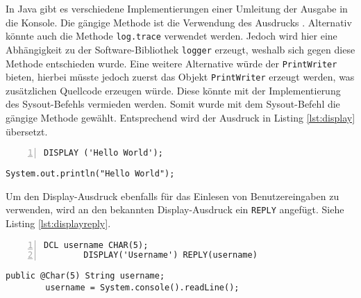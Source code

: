 In Java gibt es verschiedene Implementierungen einer Umleitung der Ausgabe in die Konsole.
Die gängige Methode ist die Verwendung des Ausdrucks . 
Alternativ könnte auch die Methode \verb+log.trace+ verwendet werden.
Jedoch wird hier eine Abhängigkeit zu der Software-Bibliothek \verb+logger+  erzeugt, weshalb sich gegen diese Methode entschieden wurde.
Eine weitere Alternative würde der \verb+PrintWriter+ bieten, hierbei müsste jedoch zuerst das Objekt \verb+PrintWriter+ erzeugt werden, was zusätzlichen Quellcode erzeugen würde. Diese könnte mit der Implementierung des Sysout-Befehls vermieden werden.
Somit wurde mit dem Sysout-Befehl die gängige Methode gewählt. Entsprechend wird der Ausdruck in Listing \ref{lst:display} übersetzt.

\begin{minipage}[b]{0.48\linewidth}
	\centering
	\lstset{language=PL/I,label=SliceExaple}
	\begin{lstlisting}[frame=single, numbers=left, mathescape,%
		caption={Transformation Standardausgabe}, label={lst:display}, basicstyle=\fontsize{9}{13}\selectfont\ttfamily]
		DISPLAY ('Hello World');
	\end{lstlisting}
\end{minipage}
\hspace{0.5cm}
\begin{minipage}[b]{0.48\linewidth}
	\centering
	\lstset{language=Java,label=SliceExaple}
	\begin{lstlisting}[frame=single, mathescape,%
		title={" "}, basicstyle=\fontsize{9}{13}\selectfont\ttfamily]
		System.out.println("Hello World");
	\end{lstlisting}
\end{minipage} 


Um den Display-Ausdruck ebenfalls für das Einlesen von Benutzereingaben zu verwenden, wird an den bekannten Display-Ausdruck ein \verb+REPLY+ angefügt. Siehe Listing \ref{lst:displayreply}.

\begin{minipage}[b]{0.48\linewidth}
	\centering
	\lstset{language=PL/I,label=SliceExaple}
	\begin{lstlisting}[frame=single, numbers=left, mathescape,%
		caption={Transformation Standardeingabe}, label={lst:displayreply}, basicstyle=\fontsize{9}{13}\selectfont\ttfamily]
		DCL username CHAR(5);
		DISPLAY('Username') REPLY(username)
	\end{lstlisting}
\end{minipage}
\hspace{0.5cm}
\begin{minipage}[b]{0.48\linewidth}
	\centering
	\lstset{language=Java,label=SliceExaple}
	\begin{lstlisting}[frame=single, mathescape,% 
		title={" "}, basicstyle=\fontsize{9}{13}\selectfont\ttfamily]
		public @Char(5) String username;
		username = System.console().readLine(); 
	\end{lstlisting}
\end{minipage} 

